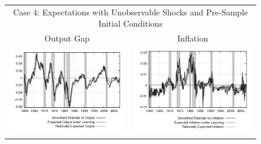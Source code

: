 \begin{figure}
\begin{tabular}{cc}
\multicolumn{2}{c}{Case 4: Expectations with Unobservable Shocks and Pre-Sample Initial Conditions} \\ 
Output Gap & Inflation \\
\includegraphics[scale=0.48]{results_wlsinit/output_exp.png} & 
\includegraphics[scale=0.48]{results_wlsinit/inflation_exp.png} \\ \\ 
 
\end{tabular}
\end{figure}

